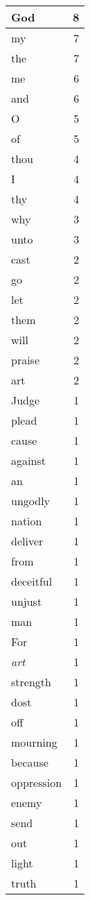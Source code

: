 \begin{center}
\begin{longtable}{l|r}
\hline \hline
\endlastfoot
God & 8 \\ \hline
my & 7 \\ \hline
the & 7 \\ \hline
me & 6 \\ \hline
and & 6 \\ \hline
O & 5 \\ \hline
of & 5 \\ \hline
thou & 4 \\ \hline
I & 4 \\ \hline
thy & 4 \\ \hline
why & 3 \\ \hline
unto & 3 \\ \hline
cast & 2 \\ \hline
go & 2 \\ \hline
let & 2 \\ \hline
them & 2 \\ \hline
will & 2 \\ \hline
praise & 2 \\ \hline
art & 2 \\ \hline
Judge & 1 \\ \hline
plead & 1 \\ \hline
cause & 1 \\ \hline
against & 1 \\ \hline
an & 1 \\ \hline
ungodly & 1 \\ \hline
nation & 1 \\ \hline
deliver & 1 \\ \hline
from & 1 \\ \hline
deceitful & 1 \\ \hline
unjust & 1 \\ \hline
man & 1 \\ \hline
For & 1 \\ \hline
\emph{art} & 1 \\ \hline
strength & 1 \\ \hline
dost & 1 \\ \hline
off & 1 \\ \hline
mourning & 1 \\ \hline
because & 1 \\ \hline
oppression & 1 \\ \hline
enemy & 1 \\ \hline
send & 1 \\ \hline
out & 1 \\ \hline
light & 1 \\ \hline
truth & 1 \\ \hline

\end{longtable}
\end{center}
